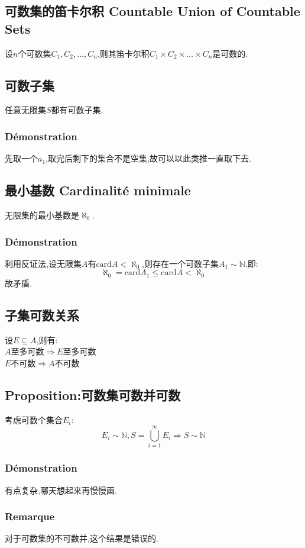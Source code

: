 \documentclass[12pt, a4paper, oneside]{ctexbook}
\newcommand{\card }{\text{card}}%
\newcommand{\N }{\mathbb{N}}%
\begin{document}
  \subsection{可数集的笛卡尔积 Countable Union of Countable Sets}
  设$n$个可数集$C_1,C_2,\dots,C_n$,则其笛卡尔积$C_1\times C_2\times\dots\times C_n$是可数的.
  \subsection{可数子集}
  任意无限集$S$都有可数子集.

  \subsubsection{Démonstration}
  先取一个$a_1$,取完后剩下的集合不是空集,故可以以此类推一直取下去.
  \subsection{最小基数 Cardinalité minimale}
  无限集的最小基数是$\aleph_0$.
  \subsubsection{Démonstration}
  利用反证法,设无限集$A$有$\card A<\aleph_0$,则存在一个可数子集$A_1\sim\N$.即:
  $$
  \aleph_0=\card A_1\leq\card A<\aleph_0
  $$
  故矛盾.
  
  \subsection{子集可数关系 }
  \noindent
  设$E\subseteq A$,则有:\\
  $A\text{至多可数}\Rightarrow E\text{至多可数}$\\
  $E\text{不可数}\Rightarrow A\text{不可数}$
  \subsection{Proposition:可数集可数并可数}\label{myref:keshujikeshubingkeshu}%
  考虑可数个集合$E_i$:
  $$
  E_i\sim\mathbb{N},S=\bigcup_{i=1}^\infty E_i\Rightarrow S\sim\mathbb{N}
  $$
  \subsubsection{Démonstration}
  有点复杂,哪天想起来再慢慢画.
  \subsubsection{Remarque}
  对于可数集的不可数并,这个结果是错误的.
\end{document}
